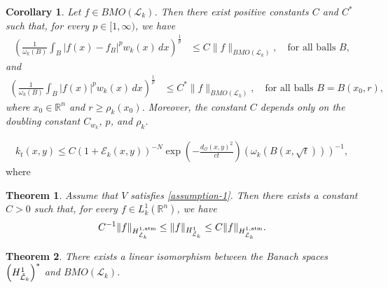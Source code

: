 \documentclass[10pt,a4paper]{amsart}
\newtheorem{corollary}{Corollary}
\newtheorem{theorem}{Theorem}
\begin{document}
\begin{corollary} \label{Corollary J-N}
Let $f \in BMO(\mathcal{L}_k)$. Then there exist positive constants $C$ and $C^*$ such that, for every $p \in [1,\infty)$, we have
\begin{align} \label{Corollary 5.4_1}
\left(\frac{1}{\omega_k(B)} \int_B |f(x)-f_B|^p w_k(x)\,dx \right)^{\frac{1}{p}}
& \leq C \|f\|_{BMO(\mathcal{L}_k)}, \quad \text{for all balls } B,
\end{align}
and
\begin{align} \label{corollary 5.4_2}
\left(\frac{1}{\omega_k(B)} \int_B |f(x)|^p w_k(x)\,dx \right)^{\frac{1}{p}}
& \leq C^* \|f\|_{BMO(\mathcal{L}_k)}, \quad \text{for all balls } B = B(x_0, r),
\end{align}
where $x_0 \in \mathbb{R}^n$ and $r \geq \rho_k(x_0)$. Moreover, the constant $C$ depends only on the doubling constant $C_{w_k}$, $p$, and $\rho_k$.
\end{corollary}

\begin{align} 
    k_t(x,y) \leq C {\left( 1+ \mathcal{E}_k(x,y)\mathcal{}   \right) ^{-N} } \exp\left(-\frac{d_\mathcal{O}(x,y)^2}{ct} \right) \left(\omega_k(B(x,\sqrt{t}))\right)^{-1}
    , \label{assumption-1} 
\end{align} where

\begin{theorem} \label{atomic decomposition} Assume that $V$ satisfies \eqref{assumption-1}. Then there exists a constant $C>0$ such that, for every $f\in L_k^1(\mathbb{R}^n)$, we have
\begin{align*}
C^{-1}\|f\|_{H_{\Tilde{\mathcal{L}}_k}^{1,\text{atm}}} \leq \|f\|_{H_{\Tilde{\mathcal{L}}_k}^1} \leq C\|f\|_{H_{\Tilde{\mathcal{L}}_k}^{1,\text{atm}}}. 
\end{align*}
\end{theorem}

\begin{theorem}
    There exists a linear isomorphism between the Banach spaces $\left( H_{\Tilde{\mathcal{L}}_k}^1\right)^*$ and $BMO(\mathcal{L}_k)$.
\end{theorem}
\end{document}
